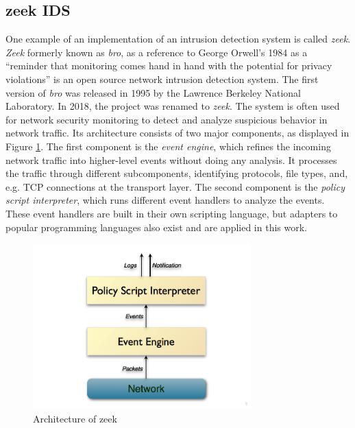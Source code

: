 \subsection{zeek IDS}
One example of an implementation of an intrusion detection system is called \emph{zeek}. \emph{Zeek} formerly known as \emph{bro}, as a reference to George Orwell's 1984 as a ``reminder that monitoring comes hand in hand with the potential for privacy violations'' \cite{zeek2023} is an open source network intrusion detection system. The first version of \emph{bro} was released in 1995 by the Lawrence Berkeley National Laboratory. In 2018, the project was renamed to \emph{zeek}. The system is often used for network security monitoring to detect and analyze suspicious behavior in network traffic. Its architecture consists of two major components, as displayed in Figure \ref{fig:zeek_architecture}. The first component is the \emph{event engine}, which refines the incoming network traffic into higher-level events without doing any analysis. It processes the traffic through different subcomponents, identifying protocols, file types, and, e.g. TCP connections at the transport layer. The second component is the \emph{policy script interpreter}, which runs different event handlers to analyze the events. These event handlers are built in their own scripting language, but adapters to popular programming languages also exist and are applied in this work.

\begin{figure}[H]
	\sffamily\footnotesize
	\includegraphics[width=0.75\textwidth]{pic/zeek_architecture.png}
	\unitlength=0.75mm
	\linethickness{0.4pt}
	\caption{Architecture of zeek \cite{zeek2023}}
	\label{fig:zeek_architecture}
\end{figure}

